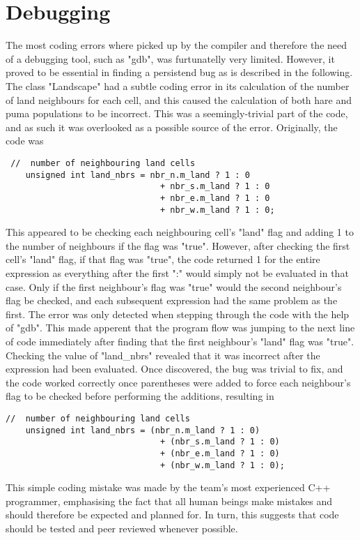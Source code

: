 \section{Debugging}
\label{Debugging}
The most coding errors where picked up by the compiler and therefore the need of a debugging tool, such as "gdb", was furtunatelly very limited.
However, it proved to be essential in finding a persistend bug as is described in the following.\\

The class "Landscape" had a subtle coding error in its calculation of the number of land neighbours for each cell, and this caused the calculation of both hare and puma populations to be incorrect.
This was a seemingly-trivial part of the code, and as such it was overlooked as a possible source of the error.
Originally, the code was

\begin{lstlisting}
 //  number of neighbouring land cells
	unsigned int land_nbrs = nbr_n.m_land ? 1 : 0
		                       + nbr_s.m_land ? 1 : 0
		                       + nbr_e.m_land ? 1 : 0
		                       + nbr_w.m_land ? 1 : 0;
\end{lstlisting}

This appeared to be checking each neighbouring cell's "land" flag and adding 1 to the number of neighbours if the flag was "true".
However, after checking the first cell's "land" flag, if that flag was "true", the code returned 1 for the entire expression as everything after the first ":" would simply not be evaluated in that case.
Only if the first neighbour's flag was "true" would the second neighbour's flag be checked, and each subsequent expression had the same problem as the first.
The error was only detected when stepping through the code with the help of "gdb". This made apperent that the program flow was jumping to the next line of code immediately after finding that the first neighbour's "land" flag was "true".
Checking the value of "land\_nbrs" revealed that it was incorrect after the expression had been evaluated.
Once discovered, the bug was trivial to fix, and the code worked correctly once parentheses were added to force each neighbour's flag to be checked before performing the additions, resulting in

\begin{lstlisting}
//  number of neighbouring land cells
	unsigned int land_nbrs = (nbr_n.m_land ? 1 : 0)
		                       + (nbr_s.m_land ? 1 : 0)
		                       + (nbr_e.m_land ? 1 : 0)
		                       + (nbr_w.m_land ? 1 : 0);
\end{lstlisting}

This simple coding mistake was made by the team's most experienced C++ programmer, emphasising the fact that all human beings make mistakes  and should therefore be expected and planned for. In turn, this suggests that code should be tested and peer reviewed whenever possible.

